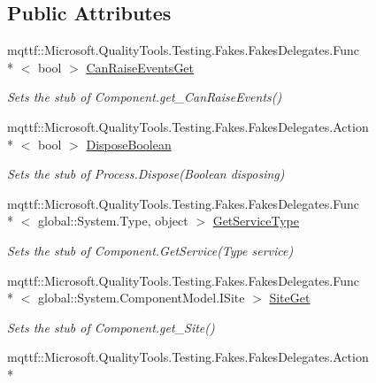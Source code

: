 \subsection*{Public Attributes}
\begin{DoxyCompactItemize}
\item 
mqttf\-::\-Microsoft.\-Quality\-Tools.\-Testing.\-Fakes.\-Fakes\-Delegates.\-Func\\*
$<$ bool $>$ \hyperlink{class_system_1_1_diagnostics_1_1_fakes_1_1_stub_process_aa90311013672e20ad2ded071e76ead47}{Can\-Raise\-Events\-Get}
\begin{DoxyCompactList}\small\item\em Sets the stub of Component.\-get\-\_\-\-Can\-Raise\-Events()\end{DoxyCompactList}\item 
mqttf\-::\-Microsoft.\-Quality\-Tools.\-Testing.\-Fakes.\-Fakes\-Delegates.\-Action\\*
$<$ bool $>$ \hyperlink{class_system_1_1_diagnostics_1_1_fakes_1_1_stub_process_a75bf326ee606ebe47279a6d061f98dca}{Dispose\-Boolean}
\begin{DoxyCompactList}\small\item\em Sets the stub of Process.\-Dispose(\-Boolean disposing)\end{DoxyCompactList}\item 
mqttf\-::\-Microsoft.\-Quality\-Tools.\-Testing.\-Fakes.\-Fakes\-Delegates.\-Func\\*
$<$ global\-::\-System.\-Type, object $>$ \hyperlink{class_system_1_1_diagnostics_1_1_fakes_1_1_stub_process_a5f1b52f3f8ae4e0b263a0abda74a0adf}{Get\-Service\-Type}
\begin{DoxyCompactList}\small\item\em Sets the stub of Component.\-Get\-Service(\-Type service)\end{DoxyCompactList}\item 
mqttf\-::\-Microsoft.\-Quality\-Tools.\-Testing.\-Fakes.\-Fakes\-Delegates.\-Func\\*
$<$ global\-::\-System.\-Component\-Model.\-I\-Site $>$ \hyperlink{class_system_1_1_diagnostics_1_1_fakes_1_1_stub_process_a1b5e62066070ad0ef55b7b7b6c346b26}{Site\-Get}
\begin{DoxyCompactList}\small\item\em Sets the stub of Component.\-get\-\_\-\-Site()\end{DoxyCompactList}\item 
mqttf\-::\-Microsoft.\-Quality\-Tools.\-Testing.\-Fakes.\-Fakes\-Delegates.\-Action\\*

\end{DoxyCompactItemize}
